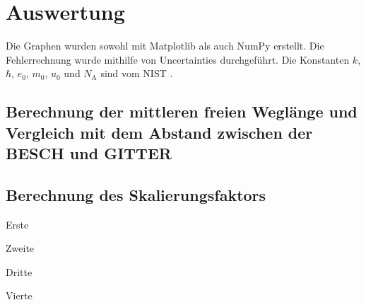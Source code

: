 \section{Auswertung}
\label{sec:Auswertung}


Die Graphen wurden sowohl mit Matplotlib \cite{matplotlib} als auch NumPy \cite{numpy} erstellt. Die
Fehlerrechnung wurde mithilfe von Uncertainties \cite{uncertainties} durchgeführt.
Die Konstanten $k$, $\hbar$, $e_0$, $m_0$, $u_0$ und $N_\text{A}$ sind vom NIST \cite{nistgov}.

\subsection{Berechnung der mittleren freien Weglänge und Vergleich mit dem Abstand zwischen der BESCH und GITTER}

\subsection{Berechnung des Skalierungsfaktors}

\begin{center}
	\begin{table}
		\begin{minipage}[t]{0.5\textwidth}
			\caption{Erste}
			\centering
			
		\end{minipage}
		\begin{minipage}[t]{0.5\textwidth}
			\caption{Zweite}
			\centering
			
		\end{minipage}
	\end{table}
\end{center}
\begin{center}
	\begin{table}
		\begin{minipage}[t]{0.5\textwidth}
			\caption{Dritte}
			\centering
			
		\end{minipage}
		\begin{minipage}[t]{0.5\textwidth}
			\caption{Vierte}
			\centering
			
		\end{minipage}
	\end{table}
\end{center}


